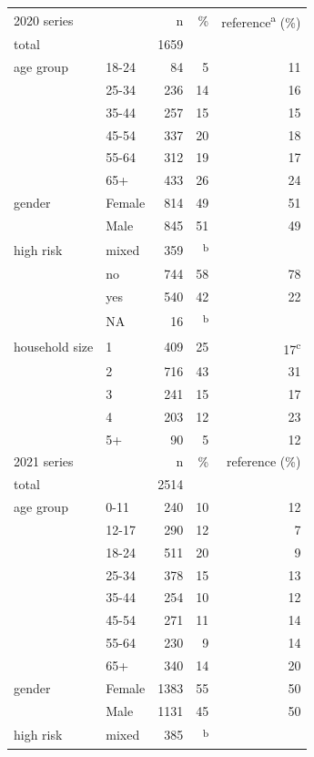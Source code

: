 \documentclass[fleqn,10pt]{wlscirep}
\begin{document}
\begin{table}[ht]
\centering
\begin{tabular}{llrrr}
  \hline
  \hline
  2020 series & & n & \% & reference\textsuperscript{a} (\%) \\ 
  total & & 1659 & & \\
  \hline
  age group & 18-24 & 84 & 5 & 11 \\ 
   & 25-34 & 236 & 14 & 16 \\ 
   & 35-44 & 257 & 15 & 15 \\ 
   & 45-54 & 337 & 20 & 18 \\ 
   & 55-64 & 312 & 19 & 17 \\ 
   & 65+ & 433 & 26 & 24 \\ 
  \hline
  gender & Female & 814 & 49 & 51 \\ 
   & Male & 845 & 51 & 49 \\ 
  \hline
  high risk & mixed & 359 & \textsuperscript{b} &  \\ 
   & no & 744 & 58 & 78 \\ 
   & yes & 540 & 42 & 22 \\ 
   & NA & 16 & \textsuperscript{b} &  \\ 
  \hline
  household size & 1 & 409 & 25 & 17\textsuperscript{c} \\ 
   & 2 & 716 & 43 & 31 \\ 
   & 3 & 241 & 15 & 17 \\ 
   & 4 & 203 & 12 & 23 \\ 
   & 5+ & 90 & 5 & 12 \\ 
  \hline
  \hline
  2021 series & & n & \% & reference (\%) \\ 
  total & & 2514 & & \\
  \hline
  age group & 0-11 & 240 & 10 & 12 \\ 
   & 12-17 & 290 & 12 & 7 \\ 
   & 18-24 & 511 & 20 & 9 \\ 
   & 25-34 & 378 & 15 & 13 \\ 
   & 35-44 & 254 & 10 & 12 \\ 
   & 45-54 & 271 & 11 & 14 \\ 
   & 55-64 & 230 & 9 & 14 \\ 
   & 65+ & 340 & 14 & 20 \\ 
  \hline
  gender & Female & 1383 & 55 & 50 \\ 
   & Male & 1131 & 45 & 50 \\ 
  \hline
  high risk & mixed & 385 & \textsuperscript{b} &  \\ 

\end{tabular}
\end{table}
\end{document}
